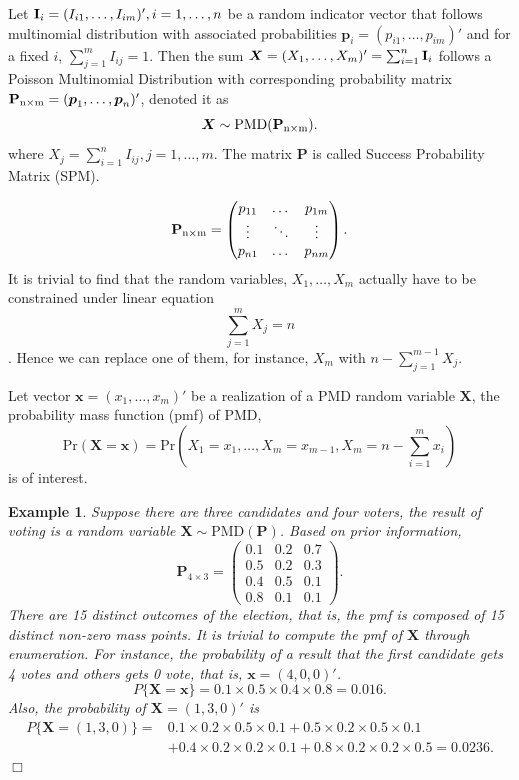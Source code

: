 \documentclass[12pt]{article}
\newcommand{\Ivec}{{\boldsymbol{\rm I}}}
\newcommand{\Xmat}{\mathbf{X}}
\newcommand{\Pmat}{\mathbf{P}}
\newcommand{\pvec}{\boldsymbol{p}}
\newcommand{\PMD}{\textrm{PMD}}
\newcommand{\Xvec}{\boldsymbol{X}}
\newcommand{\xvec}{\boldsymbol{x}}
\newcommand{\qedw}{\hfill \ensuremath{\Box}}
\newtheorem{example}{Example}
\begin{document}
Let $\Ivec_{i} = (I_{i1}, \dots, I_{im})', i=1, \dots, n$ be a random indicator vector that follows multinomial distribution with associated probabilities $\pvec_{i} = (p_{i1}, \dots, p_{im})'$ and for a fixed $i$, $\sum_{j=1}^{m} I_{ij}=1$. Then the sum $\Xvec = (X_{1}, \dots, X_{m})'= \sum_{i=1}^{n}\Ivec_{i}$ follows a Poisson Multinomial Distribution with corresponding probability matrix $\Pmat_{\rm n \times m} = (\pvec_{1}, \dots, \pvec_{n})'$, denoted it as
$$\Xvec \sim \PMD(\Pmat_{\rm n\times m}).$$ where $X_{j} = \sum_{i=1}^{n} I_{ij}, j=1,\dots,m$. The matrix $\Pmat$ is called Success Probability Matrix (SPM).

\begin{equation*}
\Pmat_{\rm n \times m} = \begin{pmatrix}
p_{11} &  \dots & p_{1m} \\
\vdots & \ddots & \vdots \\
p_{n1} &  \dots & p_{nm} \\
\end{pmatrix}.
\end{equation*}
It is trivial to find that the random variables, $X_1, \dots, X_{m}$ actually have to be constrained under linear equation $$\sum_{j=1}^{m}X_{j} = n$$. Hence we can replace one of them, for instance, $X_m$ with $n-\sum_{j=1}^{m-1}X_j$.

Let vector $\xvec = (x_1,\dots,x_m)'$ be a realization of a $\PMD$ random variable $\Xmat$, the probability mass function (pmf) of PMD,
$$\text{Pr}(\Xmat=\xvec) = \text{Pr} \left( X_1 = x_1, \dots, X_m = x_{m-1}, X_{m} = n-\sum_{i=1}^{m}x_i \right)$$
is of interest.

\begin{example}\normalfont
Suppose there are three candidates and four voters, the result of voting is a random variable $\Xmat \sim \PMD(\Pmat)$. Based on prior information,
\begin{equation*}
\Pmat_{4 \times 3} = \begin{pmatrix}
0.1 &  0.2 & 0.7\\
0.5 & 0.2 & 0.3\\
0.4 &  0.5 & 0.1\\
0.8 & 0.1 & 0.1
\end{pmatrix}.
\end{equation*}
There are 15 distinct outcomes of the election, that is, the pmf is composed of 15 distinct non-zero mass points. It is trivial to compute the pmf of $\Xmat$ through enumeration. For instance, the probability of a result that the first candidate gets 4 votes and others gets 0 vote, that is, $\xvec =  (4,0,0)'$.
\begin{equation*}
P\{\Xmat = \xvec \} = 0.1\times 0.5 \times 0.4 \times 0.8 = 0.016.
\end{equation*}
Also, the probability of $\Xmat=(1,3,0)'$ is
\begin{align*}
P\{\Xmat = (1,3,0)\}  =  & 0.1\times 0.2 \times 0.5 \times 0.1 +
 0.5\times0.2\times0.5 \times 0.1 \\
 & + 0.4\times0.2\times0.2\times0.1 + 0.8\times0.2\times0.2\times0.5 = 0.0236.
\end{align*}
\qedw
\end{example}
\end{document}
